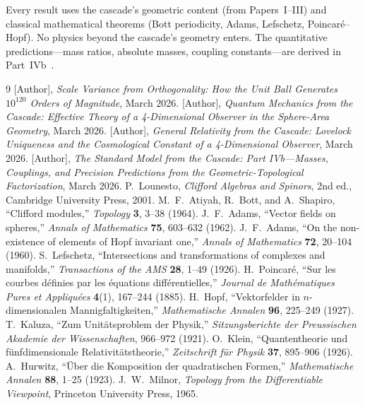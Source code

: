 \documentclass[12pt,a4paper]{article}
\begin{document}
Every result uses the cascade's geometric content (from Papers~I--III) and classical
mathematical theorems (Bott periodicity, Adams, Lefschetz, Poincar\'{e}--Hopf). No physics
beyond the cascade's geometry enters. The quantitative predictions---mass ratios, absolute
masses, coupling constants---are derived in Part~IVb~\cite{paperIVb}.

\begin{thebibliography}{9}
 [Author], \emph{Scale Variance from Orthogonality: How the Unit Ball
Generates $10^{120}$ Orders of Magnitude}, March 2026.
 [Author], \emph{Quantum Mechanics from the Cascade: Effective Theory of
a 4-Dimensional Observer in the Sphere-Area Geometry}, March 2026.
 [Author], \emph{General Relativity from the Cascade: Lovelock Uniqueness
and the Cosmological Constant of a 4-Dimensional Observer}, March 2026.
 [Author], \emph{The Standard Model from the Cascade: Part IVb---Masses,
Couplings, and Precision Predictions from the Geometric-Topological Factorization},
March 2026.
 P.~Lounesto, \emph{Clifford Algebras and Spinors}, 2nd ed., Cambridge
University Press, 2001.
 M.~F.~Atiyah, R.~Bott, and A.~Shapiro, ``Clifford modules,''
\emph{Topology} \textbf{3}, 3--38 (1964).
 J.~F.~Adams, ``Vector fields on spheres,'' \emph{Annals of Mathematics}
\textbf{75}, 603--632 (1962).
 J.~F.~Adams, ``On the non-existence of elements of Hopf invariant one,''
\emph{Annals of Mathematics} \textbf{72}, 20--104 (1960).
 S.~Lefschetz, ``Intersections and transformations of complexes and
manifolds,'' \emph{Transactions of the AMS} \textbf{28}, 1--49 (1926).
 H.~Poincar\'{e}, ``Sur les courbes d\'{e}finies par les \'{e}quations
diff\'{e}rentielles,'' \emph{Journal de Math\'{e}matiques Pures et Appliqu\'{e}es}
\textbf{4}(1), 167--244 (1885).
 H.~Hopf, ``Vektorfelder in $n$-dimensionalen Mannigfaltigkeiten,''
\emph{Mathematische Annalen} \textbf{96}, 225--249 (1927).
 T.~Kaluza, ``Zum Unit\"{a}tsproblem der Physik,'' \emph{Sitzungsberichte
der Preussischen Akademie der Wissenschaften}, 966--972 (1921).
 O.~Klein, ``Quantentheorie und f\"{u}nfdimensionale Relativit\"{a}tstheorie,''
\emph{Zeitschrift f\"{u}r Physik} \textbf{37}, 895--906 (1926).
 A.~Hurwitz, ``\"{U}ber die Komposition der quadratischen Formen,''
\emph{Mathematische Annalen} \textbf{88}, 1--25 (1923).
 J.~W.~Milnor, \emph{Topology from the Differentiable Viewpoint},
Princeton University Press, 1965.
\end{thebibliography}
\end{document}
